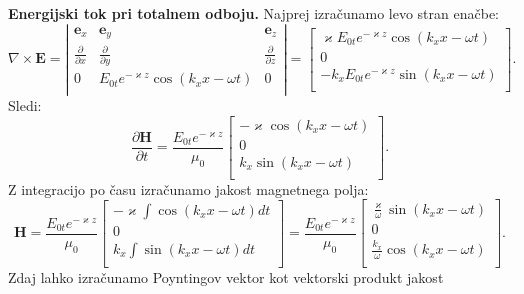 \begin{example}{\bf Energijski tok pri totalnem odboju.}
Najprej izračunamo levo stran enačbe:
\begin{equation}
\nabla \times \mathbf{E} = \left|
\begin{array}{ccc}
\mathbf{e}_x & \mathbf{e}_y & \mathbf{e}_z \\
\frac{\partial}{\partial x} & \frac{\partial}{\partial y} & \frac{\partial}{\partial z} \\
0&E_{0t}e^{-\varkappa z} \cos \left(k_xx-\omega t\right)& 0 \\
\end{array}
\right| = \left[
\begin{array}{c}
\varkappa E_{0t} e^{-\varkappa z} \cos \left(k_xx-\omega t\right) \\
0\\
-k_x E_{0t} e^{-\varkappa z} \sin \left(k_xx-\omega t\right)\\
\end{array}
\right]\!\!.
\label{eq:04_73}
\end{equation}
Sledi:
\begin{equation}
\frac{\partial \mathbf{H}}{\partial t} = \frac{E_{0t} e^{-\varkappa z}}{\mu_0} \left[
\begin{array}{c}
-\varkappa  \cos \left(k_xx-\omega t\right) \\
0\\
k_x \sin \left(k_xx-\omega t\right)\\
\end{array}
\right]\!\!.
\label{eq:04_74}
\end{equation}
Z integracijo po času izračunamo jakost magnetnega polja:
\begin{equation}
\mathbf{H} = \frac{E_{0t}e^{-\varkappa z}}{\mu_0} \left[
\begin{array}{c}
-\varkappa  \int \cos \left(k_xx-\omega t\right) dt\\
0\\
k_x  \int\sin \left(k_xx-\omega t\right) dt\\
\end{array}
\right] = 
\frac{E_{0t}e^{-\varkappa z}}{\mu_0} \left[
\begin{array}{c}
\frac{\varkappa}{\omega}  \sin \left(k_xx-\omega t\right)\\
0\\
\frac{k_x}{\omega} \cos \left(k_xx-\omega t\right)\\
\end{array}
\right]\!\!.
\label{eq:04_75}
\end{equation}
Zdaj lahko izračunamo Poyntingov vektor kot vektorski produkt jakost

\end{example}
